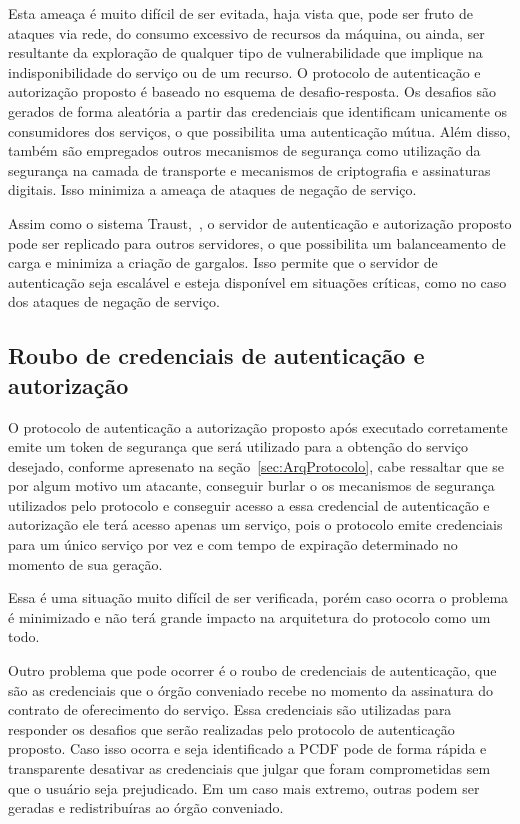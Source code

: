 Esta ameaça é muito difícil de ser evitada, haja vista que,  pode ser fruto de ataques via rede, do consumo excessivo de recursos da máquina,  ou ainda,  ser resultante da exploração de qualquer tipo de vulnerabilidade que implique na indisponibilidade do serviço ou de um recurso. O protocolo de autenticação e autorização proposto é baseado no esquema de desafio-resposta. Os desafios são gerados de forma aleatória a partir das credenciais que identificam unicamente os consumidores dos serviços, o que possibilita uma autenticação mútua. Além disso, também são empregados outros mecanismos de segurança como utilização da segurança na camada de transporte e mecanismos de criptografia e assinaturas digitais. Isso minimiza a ameaça de ataques de negação de serviço.

Assim como o sistema Traust,~\cite{traust08}, o servidor de autenticação e autorização proposto pode ser replicado para outros servidores, o que possibilita um balanceamento de carga e minimiza a criação de gargalos. Isso permite que o servidor de autenticação seja escalável e esteja disponível em situações críticas, como no caso dos ataques de negação de serviço.


\subsection{Roubo de credenciais de autenticação e autorização}\label{subsec:RouboCred}

O protocolo de autenticação a autorização proposto após executado corretamente emite um token de segurança que será utilizado para a obtenção do serviço desejado, conforme apresenato na seção~\ref{sec:ArqProtocolo}, cabe ressaltar que se por algum motivo um atacante, conseguir burlar o os mecanismos de segurança utilizados pelo protocolo e conseguir acesso a essa credencial de autenticação e autorização ele terá acesso apenas um serviço, pois o protocolo emite credenciais para um único serviço por vez e com tempo de expiração determinado no momento de sua geração.

Essa é uma situação muito difícil de ser verificada, porém caso ocorra o problema é minimizado e não terá grande impacto na arquitetura do protocolo como um todo.

Outro problema que pode ocorrer é o roubo de credenciais de autenticação, que são as credenciais que o órgão conveniado recebe no momento da assinatura do contrato de oferecimento do serviço. Essa credenciais são utilizadas para responder os desafios que serão realizadas pelo protocolo de autenticação proposto. Caso isso ocorra e seja identificado a PCDF pode de forma rápida e transparente desativar as credenciais que julgar que foram comprometidas sem que o usuário seja prejudicado. Em um caso mais extremo, outras podem ser geradas e redistribuíras ao órgão conveniado.

